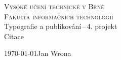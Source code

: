 \begin{titlepage}
\begin{center}
\textsc{{\Huge Vysoké učení technické v Brně}\\
\medskip
{\huge Fakulta informačních technologií}}\\
{\LARGE Typografie a publikování\,--\,4. projekt}\\
\medskip
{\Huge Citace}\\
\end{center}
{\Large \today \hfill Jan Wrona}
\end{titlepage}
